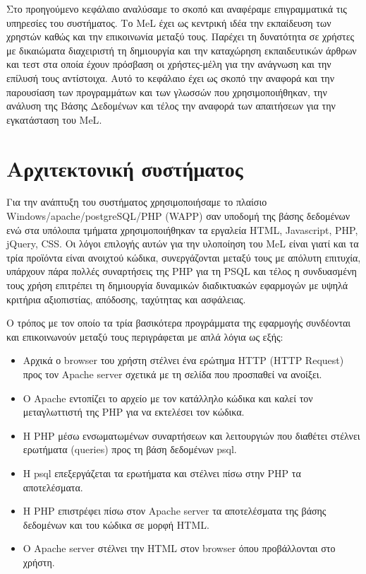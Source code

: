 
Στο προηγούμενο κεφάλαιο αναλύσαμε το σκοπό και αναφέραμε επιγραμματικά τις υπηρεσίες του συστήματος. Το \textlatin{MeL} έχει ως κεντρική ιδέα την εκπαίδευση των χρηστών καθώς και την επικοινωνία μεταξύ τους. Παρέχει τη δυνατότητα σε χρήστες με δικαιώματα διαχειριστή τη δημιουργία και την καταχώρηση εκπαιδευτικών άρθρων και τεστ στα οποία έχουν πρόσβαση οι χρήστες-μέλη για την ανάγνωση και την επίλυσή τους αντίστοιχα.
Αυτό το κεφάλαιο έχει ως σκοπό την αναφορά και την παρουσίαση των προγραμμάτων και των γλωσσών που χρησιμοποιήθηκαν, την ανάλυση της Βάσης Δεδομένων και τέλος την αναφορά των απαιτήσεων για την εγκατάσταση του \textlatin{MeL}.

\section{Αρχιτεκτονική συστήματος}
Για την ανάπτυξη του συστήματος χρησιμοποιήσαμε το πλαίσιο \textlatin{Windows/apache/postgreSQL/PHP (WAPP)} σαν υποδομή της βάσης δεδομένων ενώ στα υπόλοιπα τμήματα χρησιμοποιήθηκαν τα εργαλεία \textlatin{HTML, Javascript, PHP, jQuery, CSS.} Οι λόγοι επιλογής αυτών για την υλοποίηση του \textlatin{MeL} είναι γιατί και τα τρία προϊόντα είναι ανοιχτού κώδικα, συνεργάζονται μεταξύ τους με απόλυτη επιτυχία, υπάρχουν πάρα πολλές συναρτήσεις της \textlatin{PHP} για τη \textlatin{PSQL} και τέλος η συνδυασμένη τους χρήση επιτρέπει τη δημιουργία δυναμικών διαδικτυακών εφαρμογών με υψηλά κριτήρια αξιοπιστίας, απόδοσης, ταχύτητας και ασφάλειας. 

Ο τρόπος με τον οποίο τα τρία βασικότερα προγράμματα της εφαρμογής συνδέονται και επικοινωνούν μεταξύ τους περιγράφεται με απλά λόγια ως εξής: 
\begin{itemize}
\item
 Αρχικά ο \textlatin{browser} του χρήστη στέλνει ένα ερώτημα \textlatin{HTTP (HTTP Request)} προς τον \textlatin{Apache server} σχετικά με τη σελίδα που προσπαθεί να ανοίξει. 
\item
 Ο \textlatin{Apache} εντοπίζει το αρχείο με τον κατάλληλο κώδικα και καλεί τον μεταγλωττιστή της \textlatin{PHP} για να εκτελέσει τον κώδικα. 
\item
 Η \textlatin{PHP} μέσω ενσωματωμένων συναρτήσεων και λειτουργιών που διαθέτει στέλνει ερωτήματα \textlatin{(queries)} προς τη βάση δεδομένων \textlatin{psql.} 
\item
 Η \textlatin{psql} επεξεργάζεται τα ερωτήματα και στέλνει πίσω στην \textlatin{PHP} τα αποτελέσματα. 
\item
 Η \textlatin{PHP} επιστρέφει πίσω στον \textlatin{Apache server} τα αποτελέσματα της βάσης δεδομένων και του κώδικα σε μορφή \textlatin{HTML}. 
\item
 Ο \textlatin{Apache server} στέλνει την \textlatin{HTML} στον \textlatin{browser} όπου προβάλλονται στο χρήστη. 
\end{itemize}

